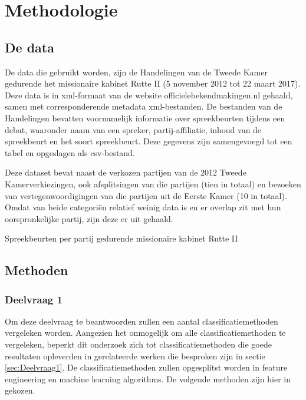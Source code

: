 \section{Methodologie}
\label{sec:meth}


\subsection{De data}
De data die gebruikt worden, zijn de Handelingen van de Tweede Kamer gedurende het missionaire kabinet Rutte II (5 november 2012 tot 22 maart 2017). Deze data is in xml-formaat van de website officielebekendmakingen.nl gehaald, samen met corresponderende metadata xml-bestanden. De bestanden van de Handelingen bevatten voornamelijk informatie over spreekbeurten tijdens een debat, waaronder naam van een spreker, partij-affiliatie, inhoud van de spreekbeurt en het soort spreekbeurt. Deze gegevens zijn samengevoegd tot een tabel en opgeslagen als csv-bestand.\par
Deze dataset bevat naast de verkozen partijen van de 2012 Tweede Kamerverkiezingen, ook afsplitsingen van die partijen (tien in totaal) en bezoeken van vertegenwoordigingen van die partijen uit de Eerste Kamer (10 in totaal). Omdat van beide categori\"{e}n relatief weinig data is en er overlap zit met hun oorspronkelijke partij, zijn deze er uit gehaald.
\begin{table}[H]
\caption{Spreekbeurten per partij gedurende missionaire kabinet Rutte II}
\centering

\end{table}




\pagebreak
\subsection{Methoden}


\subsubsection{Deelvraag 1}

Om deze deelvraag te beantwoorden zullen een aantal classificatiemethoden vergeleken worden. Aangezien het onmogelijk om alle classificatiemethoden te vergeleken, beperkt dit onderzoek zich tot classificatiemethoden die goede resultaten opleverden in gerelateerde werken die besproken zijn in sectie \ref{sec:Deelvraag1}. De classificatiemethoden zullen opgesplitst worden in feature engineering en machine learning algorithms. De volgende methoden zijn hier in gekozen.

